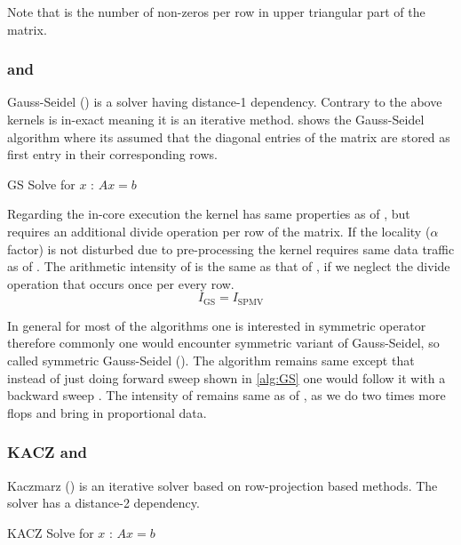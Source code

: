 Note that \NNZRSYMM is the number of non-zeros per row in upper triangular part of the matrix.

\subsubsection{\GS and \SYMMGS}
Gauss-Seidel (\GS) is a solver having distance-1 dependency. Contrary to the above kernels \GS is in-exact meaning it is an iterative method.  shows the Gauss-Seidel algorithm where its assumed that the diagonal entries of the matrix are stored as first entry in their corresponding rows.
\begin{algorithm}[H]
	\caption{GS Solve for $x$ : $Ax=b$} 
	\label{alg:GS}
	\begin{algorithmic}[1]
		\ENDFOR
		\ENDFOR
	\end{algorithmic}
\end{algorithm}
Regarding the in-core execution the kernel has same properties as of \SpMV, but requires an additional divide operation per row of the matrix. If the locality ($\alpha$ factor) is not disturbed due to pre-processing the kernel requires same data traffic as of \SpMV. The arithmetic intensity of \GS is the same as that of \SpMV, if we neglect the divide operation that occurs once per every row.
\begin{equation}
\label{eq:GS_intensity}
I_\mathrm{GS} = I_\mathrm{SPMV}
\end{equation}

In general for most of the algorithms one is interested in symmetric operator therefore commonly one would encounter symmetric variant of Gauss-Seidel, so called symmetric Gauss-Seidel (\SYMMGS). The algorithm remains same except that instead of just doing forward sweep shown in \cref{alg:GS} one would follow it with a backward sweep . The intensity of \SYMMGS remains same as of \GS, as we do two times more flops and bring in proportional data.

\subsubsection{KACZ and \SYMMKACZ}
Kaczmarz (\KACZ) is an iterative solver based on row-projection based methods. The solver has a distance-2 dependency.
\begin{algorithm}[H]
	\caption{KACZ Solve for $x$ : $Ax=b$} 
	\label{alg:KACZ}
	\begin{algorithmic}[1]
		\ENDFOR
		\ENDFOR
		\ENDFOR
	\end{algorithmic}
\end{algorithm}

